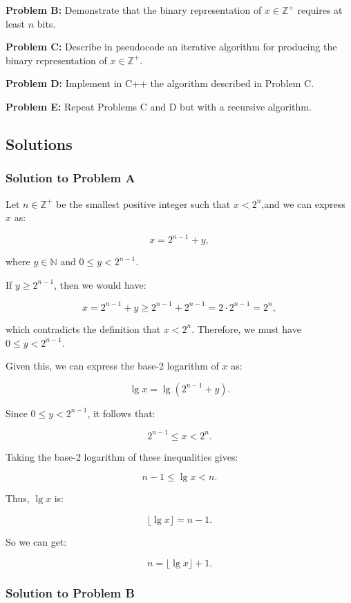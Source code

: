 \documentclass{article}
\begin{document}
\begin{itemize}
\textbf{Problem B:} Demonstrate that the binary representation of \( x \in \mathbb{Z}^+ \) requires at least \( n \) bits.

\textbf{Problem C:} Describe in pseudocode an iterative algorithm for producing the binary representation of \( x \in \mathbb{Z}^+ \).

\textbf{Problem D:} Implement in C++ the algorithm described in Problem C.

\textbf{Problem E:} Repeat Problems C and D but with a recursive algorithm.

\subsection*{Solutions}

\subsubsection*{Solution to Problem A}

Let \( n \in \mathbb{Z}^+ \) be the smallest positive integer such that \( x < 2^n \),and we can express \( x \) as:

\[
x = 2^{n-1} + y,
\]

where \( y \in \mathbb{N} \) and \( 0 \leq y < 2^{n-1} \). 

If \( y \geq 2^{n-1} \), then we would have:

\[
x = 2^{n-1} + y \geq 2^{n-1} + 2^{n-1} = 2 \cdot 2^{n-1} = 2^n,
\]

which contradicts the definition that \( x < 2^n \). Therefore, we must have \( 0 \leq y < 2^{n-1} \).

Given this, we can express the base-2 logarithm of \( x \) as:

\[
\lg x = \lg (2^{n-1} + y).
\]

Since \( 0 \leq y < 2^{n-1} \), it follows that:

\[
2^{n-1} \leq x < 2^n.
\]

Taking the base-2 logarithm of these inequalities gives:

\[
n - 1 \leq \lg x < n.
\]

Thus, \( \lg x \) is:

\[
\lfloor \lg x \rfloor = n - 1.
\]

So we can get:

\[
n = \lfloor \lg x \rfloor + 1.
\]


\subsubsection*{Solution to Problem B}


\end{itemize}
\end{document}
